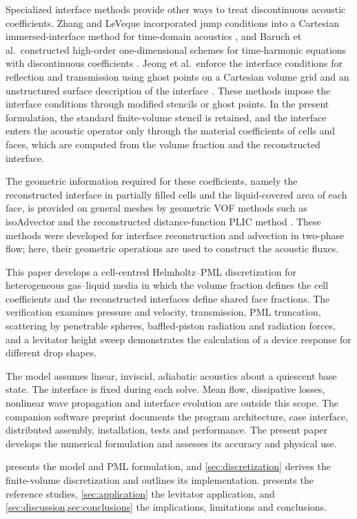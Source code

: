 \documentclass[final,12pt,nopreprintline,longtitle]{elsarticle}
\begin{document}
Specialized interface methods provide other ways to treat discontinuous
acoustic coefficients.  Zhang and LeVeque incorporated jump conditions into a
Cartesian immersed-interface method for time-domain acoustics
\cite{ZhangLeVeque1997}, and Baruch et al.\ constructed high-order
one-dimensional schemes for time-harmonic equations with discontinuous
coefficients \cite{Baruch2009}.  Jeong et al.\ enforce the interface
conditions for reflection and transmission using ghost points on a Cartesian
volume grid and an unstructured surface description of the interface
\cite{Jeong2021}.  These methods impose the interface conditions through
modified stencils or ghost points.  In the present formulation, the standard
finite-volume stencil is retained, and the interface enters the acoustic
operator only through the material coefficients of cells and faces, which are
computed from the volume fraction and the reconstructed interface.

The geometric information required for these coefficients, namely the
reconstructed interface in partially filled cells and the liquid-covered area
of each face, is provided on general meshes by geometric VOF methods such as
isoAdvector and the reconstructed distance-function PLIC method
\cite{Roenby2016,Scheufler2019}.  These methods were developed for interface
reconstruction and advection in two-phase flow; here, their geometric operations are used to construct the
acoustic fluxes.

This paper develops a cell-centred Helmholtz--PML discretization for
heterogeneous gas--liquid media in which the volume fraction defines the cell
coefficients and the reconstructed interfaces define shared face fractions.
The verification examines pressure and velocity, transmission, PML
truncation, scattering by penetrable spheres, baffled-piston radiation and
radiation forces, and a
levitator height sweep demonstrates the calculation of a device response for
different drop shapes.

The model assumes linear, inviscid, adiabatic acoustics about a quiescent base
state.  The interface is fixed during each solve.  Mean flow,
dissipative losses, nonlinear wave propagation and interface evolution are
outside this scope.  The companion software preprint
\cite{Xu2026AcousticHelmholtzFoam} documents the program architecture, case
interface, distributed assembly, installation, tests and performance.  The
present paper develops the numerical formulation and assesses its accuracy
and physical use.

 presents the model and PML formulation, and
\cref{sec:discretization} derives the finite-volume discretization and outlines
its implementation.   presents the reference studies,
\cref{sec:application} the levitator application, and
\cref{sec:discussion,sec:conclusions} the implications, limitations and
conclusions.
\end{document}
